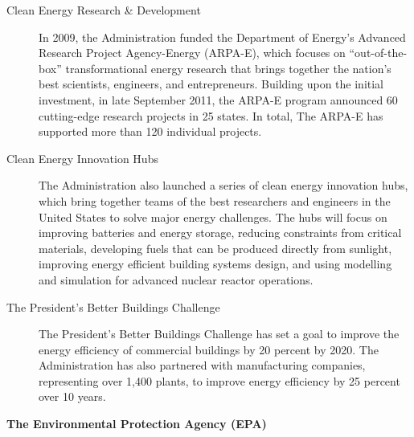 \begin{description}
	\item [Clean Energy Research \& Development] In 2009, the Administration funded the Department of Energy’s Advanced Research Project Agency-Energy (ARPA-E), which focuses on “out-of-the-box” transformational energy research that brings together the nation’s best scientists, engineers, and entrepreneurs. Building upon the initial investment, in late September 2011, the ARPA-E program announced 60 cutting-edge research projects in 25 states. In total, The ARPA-E has supported more than 120 individual projects.
	\item [Clean Energy Innovation Hubs] The Administration also launched a series of clean energy innovation hubs, which bring together teams of the best researchers and engineers in the United States to solve major energy challenges. The hubs will focus on improving batteries and energy storage, reducing constraints from critical materials, developing fuels that can be produced directly from sunlight, improving energy efficient building systems design, and using modelling and simulation for advanced nuclear reactor operations.
	\item [The President's Better Buildings Challenge] The President's Better Buildings Challenge has set a goal to improve the energy efficiency of commercial buildings by 20 percent by 2020. The Administration has also partnered with manufacturing companies, representing over 1,400 plants, to improve energy efficiency by 25 percent over 10 years.
\end{description}	


\textbf{The Environmental Protection Agency (EPA)}
	
